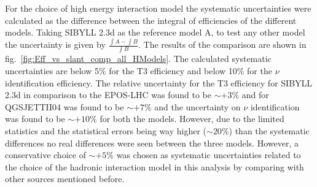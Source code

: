 For the choice of high energy interaction model the systematic uncertainties were calculated as the difference between the integral of efficiencies of the different models. Taking SIBYLL 2.3d as the reference model A, to test any other model the uncertainty is given by $\frac{\int A - \int B}{\int B}$. The results of the comparison are shown in fig.~\ref{fig:Eff_vs_slant_comp_all_HModels}. The calculated systematic uncertainties are below 5\% for the T3 efficiency and below 10\% for the $\nu$ identification efficiency. The relative uncertainty for the T3 efficiency for SIBYLL 2.3d in comparison to the EPOS-LHC was found to be $\sim +3\%$ and for QGSJETTII04 was found to be $\sim + 7\%$ and the uncertainty on $\nu$ identification was found to be $\sim +10\%$ for both the models. However, due to the limited statistics and the statistical errors being way higher ($\sim 20\%$) than the systematic differences no real differences were seen between the three models. However, a conservative choice of $\sim +5\%$ was chosen as systematic uncertainties related to the choice of the hadronic interaction model in this analysis by comparing with other sources mentioned before.  


